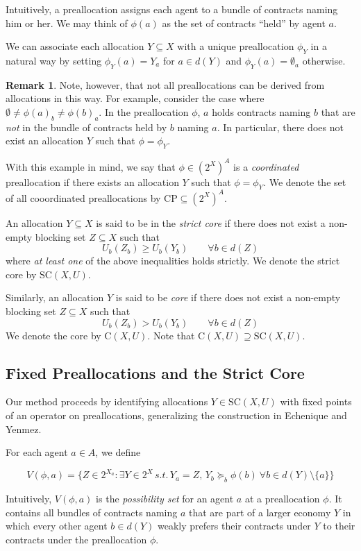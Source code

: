 \documentclass[11pt,reqno]{amsart}
\theoremstyle{definition}
\newtheorem{remark}[thm]{Remark}
\numberwithin{equation}{section}
\newcommand{\pre}{\phi}
\newcommand{\coordpre}{\mathrm{CP}}
\newcommand{\prealloc}{(2^X)^A}
\newcommand{\sub}{\subseteq}
\newcommand{\strcore}{\mathrm{SC}(X,U)}
\newcommand{\core}{\mathrm{C}(X,U)}
\newcommand{\suq}{\succeq}
\begin{document}
Intuitively, a preallocation assigns each agent to a bundle of contracts naming him or her. We may think of $\pre(a)$ as the set of contracts ``held'' by agent $a$.   

We can associate each allocation $Y\subseteq X$ with a unique preallocation $\pre_Y$ in a natural way by setting $\pre_Y(a) = Y_a$ for $a \in d(Y)$ and $\pre_Y(a) = \emptyset_a$ otherwise.
\begin{remark} Note, however, that not all preallocations can be derived from allocations in this way.
For example, consider the case where $\emptyset \not = \pre(a)_b \not = \pre(b)_a$. In the preallocation $\pre$, $a$ holds contracts naming $b$ that are \emph{not} in the bundle of contracts held by $b$ naming $a$.  
In particular, there does not exist an allocation $Y$ such that $\pre = \pre_Y$. 
\end{remark}

With this example in mind, we say that $\pre \in \prealloc$ is a \emph{coordinated} preallocation if there exists an allocation $Y$ such that $\pre = \pre_Y$. 
We denote the set of all cooordinated preallocations by $\coordpre\sub \prealloc$.

An allocation $Y \sub X$ is said to be in the \emph{strict core} if there does not exist a non-empty blocking set $Z \sub X$ such that 
\[
U_b(Z_b) \geq U_b(Y_b) \qquad  \forall b\in d(Z)
\]
where \emph{at least one} of the above inequalities holds strictly.
We denote the strict core by $\strcore$. 

Similarly, an allocation $Y$ is said to be \emph{core} if there does not exist a non-empty blocking set $Z \sub X$ such that 
\[
U_b(Z_b) > U_b(Y_b) \qquad  \forall b\in d(Z)
\]
We denote the core by $\core$. 
Note that $\core \supseteq \strcore$.

\subsection{Fixed Preallocations and the Strict Core}
Our method proceeds by identifying allocations $Y \in \strcore$ with fixed points of an operator on preallocations, generalizing the construction in Echenique and Yenmez. 

For each agent $a \in A$, we define 

\[
V(\pre, a) = \{Z \in 2^{X_a}: \exists Y \in 2^X \, s.t. \,  Y_a = Z, \, Y_b \suq_b \pre(b) \: \forall b \in d(Y)\setminus\{a\} \}
\]

Intuitively, $V(\pre, a)$ is the \emph{possibility set} for an agent $a$ at a preallocation $\pre$. 
It contains all bundles of contracts naming $a$ that are part of a larger economy $Y$ in which every other agent $b \in d(Y)$ weakly prefers their contracts under $Y$ to their contracts under the preallocation $\pre$.  
\end{document}
